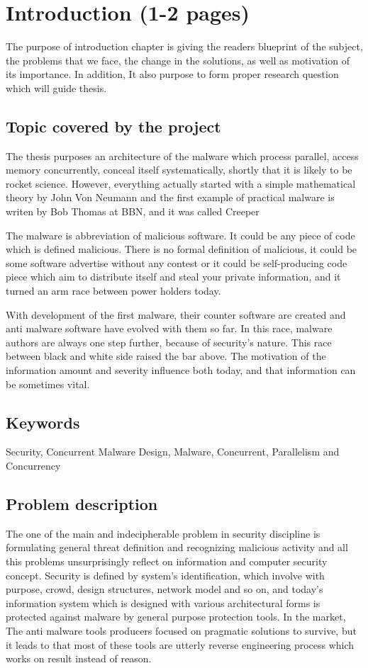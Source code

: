 \documentclass[informationsecurity]{gucmasterproject}
\begin{document}
\chapter{Introduction (1-2 pages)}
The purpose of introduction chapter is giving the readers blueprint of the subject, the problems that we face, the change in the solutions, as well as motivation of its importance. In addition, It also purpose to form proper research question which will guide thesis. 

\section{Topic covered by the project}
The thesis purposes an architecture of the malware which process parallel, access memory concurrently, conceal itself systematically, shortly that it is likely to be rocket science. However, everything actually started with a simple mathematical theory by John Von Neumann \cite{von1966theory} and the first example of practical malware is writen by Bob Thomas at BBN, and it was called Creeper 

The malware is abbreviation of malicious software. It could be any piece of code which is defined malicious. There is no formal definition of malicious, it could be some software advertise without any contest or it could be self-producing code piece which aim to distribute itself and steal your private information, and it turned an arm race between power holders today.

With development of the first malware, their counter software are created and anti malware software have evolved with them so far. In this race, malware authors are always one step further, because of security's nature. This race between black and white side raised the bar above. The motivation of the information amount and severity influence both today, and that information can be sometimes vital. 


\section{Keywords}
Security, Concurrent Malware Design, Malware, Concurrent, Parallelism and Concurrency

\section{Problem description}
The one of the main and indecipherable problem in security discipline is formulating general threat definition and recognizing malicious activity and all this problems unsurprisingly reflect on information and computer security concept. Security is defined by system’s identification, which involve with purpose, crowd, design structures, network model and so on, and today’s information system which is designed with various architectural forms is protected against malware by general purpose protection tools. In the market, The anti malware tools producers focused on pragmatic solutions to survive, but it leads to that most of these tools are utterly reverse engineering process which works on result instead of reason.
\end{document}
